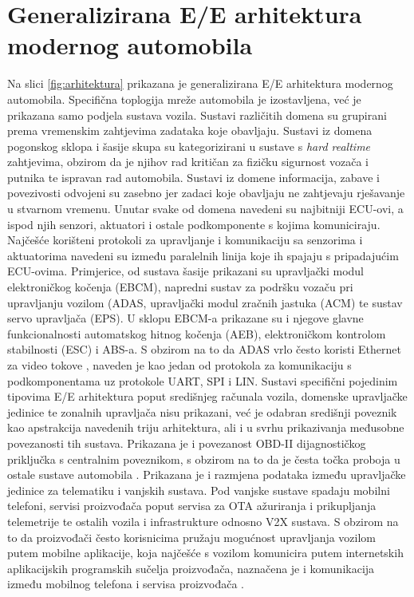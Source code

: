 \documentclass[times, utf8, diplomski, numeric]{fer}
\begin{document}
\section{Generalizirana E/E arhitektura modernog automobila}
Na slici \ref{fig:arhitektura} prikazana je generalizirana E/E arhitektura modernog automobila. Specifična toplogija mreže automobila je izostavljena, već je prikazana samo podjela sustava vozila. Sustavi različitih domena su grupirani prema vremenskim zahtjevima zadataka koje obavljaju. Sustavi iz domena pogonskog sklopa i šasije skupa su kategorizirani u sustave s \textit{hard realtime} zahtjevima, obzirom da je njihov rad kritičan za fizičku sigurnost vozača i putnika te ispravan rad automobila. Sustavi iz domene informacija, zabave i povezivosti odvojeni su zasebno jer zadaci koje obavljaju ne zahtjevaju rješavanje u stvarnom vremenu. Unutar svake od domena navedeni su najbitniji ECU-ovi, a ispod njih senzori, aktuatori i ostale podkomponente s kojima komuniciraju. Najčešće korišteni protokoli za upravljanje i komunikaciju sa senzorima i aktuatorima navedeni su između paralelnih linija koje ih spajaju s pripadajućim ECU-ovima. Primjerice, od sustava šasije prikazani su upravljački modul elektroničkog kočenja (EBCM), napredni sustav za podršku vozaču pri upravljanju vozilom (ADAS, upravljački modul zračnih jastuka (ACM) te sustav servo upravljača (EPS). U sklopu EBCM-a prikazane su i njegove glavne funkcionalnosti automatskog hitnog kočenja (AEB), elektroničkom kontrolom stabilnosti (ESC) i ABS-a. S obzirom na to da ADAS vrlo često koristi Ethernet za video tokove \cite{nasser2023automotive}, naveden je kao jedan od protokola za komunikaciju s podkomponentama uz protokole UART, SPI i LIN. Sustavi specifični pojedinim tipovima E/E arhitektura poput središnjeg računala vozila, domenske upravljačke jedinice te zonalnih upravljača nisu prikazani, već je odabran središnji poveznik kao apstrakcija navedenih triju arhitektura, ali i u svrhu prikazivanja međusobne povezanosti tih sustava. Prikazana je i povezanost OBD-II dijagnostičkog priključka s centralnim poveznikom, s obzirom na to da je česta točka proboja u ostale sustave automobila \cite{knight2020hacking, smith2016car}. Prikazana je i razmjena podataka između upravljačke jedinice za telematiku i vanjskih sustava. Pod vanjske sustave spadaju mobilni telefoni, servisi proizvođača poput servisa za OTA ažuriranja i prikupljanja telemetrije te ostalih vozila i infrastrukture odnosno V2X sustava. S obzirom na to da proizvođači često korisnicima pružaju mogućnost upravljanja vozilom putem mobilne aplikacije, koja najčešće s vozilom komunicira putem internetskih aplikacijskih programskih sučelja proizvođača, naznačena je i komunikacija između mobilnog telefona i servisa proizvođača \cite{curry2023web}.  
\end{document}
